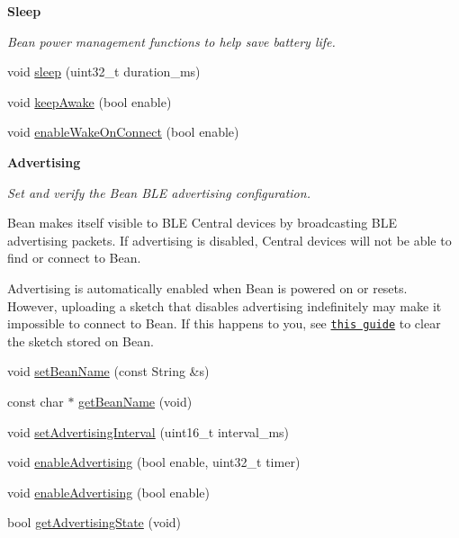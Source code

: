 \begin{Indent}{\bf Sleep}\par
{\em Bean power management functions to help save battery life. }\begin{DoxyCompactItemize}
\item 
void \hyperlink{class_bean_class_a15d6716d0bdc66a0345acc29d0c14a14}{sleep} (uint32\+\_\+t duration\+\_\+ms)
\item 
void \hyperlink{class_bean_class_abbd5ae43b98270dfc94b98b2ecd66281}{keep\+Awake} (bool enable)
\item 
void \hyperlink{class_bean_class_a639e425394c820a99025d136dddd3369}{enable\+Wake\+On\+Connect} (bool enable)
\end{DoxyCompactItemize}
\end{Indent}
\begin{Indent}{\bf Advertising}\par
{\em Set and verify the Bean B\+LE advertising configuration.

Bean makes itself visible to B\+LE Central devices by broadcasting B\+LE advertising packets. If advertising is disabled, Central devices will not be able to find or connect to Bean.

Advertising is automatically enabled when Bean is powered on or resets. However, uploading a sketch that disables advertising indefinitely may make it impossible to connect to Bean. If this happens to you, see \href{https://punchthrough.com/bean/guides/help/troubleshooting/#reset-your-bean-s-memory}{\tt this guide} to clear the sketch stored on Bean. }\begin{DoxyCompactItemize}
\item 
void \hyperlink{class_bean_class_a32c0dc702c367caf274b72ba4a4cb8a2}{set\+Bean\+Name} (const String \&s)
\item 
const char $\ast$ \hyperlink{class_bean_class_a5b50d48ce0b6ccb3f267d1d7ba660dd3}{get\+Bean\+Name} (void)
\item 
void \hyperlink{class_bean_class_a41412684c0f01f06f260fb1e724475d9}{set\+Advertising\+Interval} (uint16\+\_\+t interval\+\_\+ms)
\item 
void \hyperlink{class_bean_class_a9bff2d903c4a543ba48f0ac1b392c7cc}{enable\+Advertising} (bool enable, uint32\+\_\+t timer)
\item 
void \hyperlink{class_bean_class_ade5d4c6a061eeb6d7897ef4c3b2c26d3}{enable\+Advertising} (bool enable)
\item 
bool \hyperlink{class_bean_class_a099bbffcf98e71f533f8277ec5274785}{get\+Advertising\+State} (void)
\end{DoxyCompactItemize}
\end{Indent}
